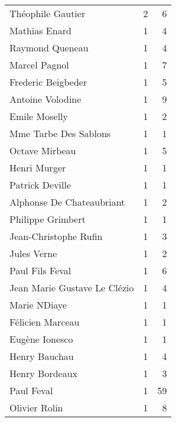 \begin{xltabular}{\textwidth}{lrr}
                   Théophile Gautier &          2 &                6 \\
                       Mathias Enard &          1 &                4 \\
                     Raymond Queneau &          1 &                4 \\
                       Marcel Pagnol &          1 &                7 \\
                  Frederic Beigbeder &          1 &                5 \\
                    Antoine Volodine &          1 &                9 \\
                       Emile Moselly &          1 &                2 \\
               Mme Tarbe Des Sablons &          1 &                1 \\
                      Octave Mirbeau &          1 &                5 \\
                        Henri Murger &          1 &                1 \\
                     Patrick Deville &          1 &                1 \\
           Alphonse De Chateaubriant &          1 &                2 \\
                   Philippe Grimbert &          1 &                1 \\
               Jean-Christophe Rufin &          1 &                3 \\
                        Jules  Verne &          1 &                2 \\
                     Paul Fils Feval &          1 &                6 \\
        Jean Marie Gustave Le Clézio &          1 &                4 \\
                        Marie NDiaye &          1 &                1 \\
                    Félicien Marceau &          1 &                1 \\
                      Eugène Ionesco &          1 &                1 \\
                       Henry Bauchau &          1 &                4 \\
                      Henry Bordeaux &          1 &                3 \\
                          Paul Feval &          1 &               59 \\
                       Olivier Rolin &          1 &                8 \\

\end{xltabular}
